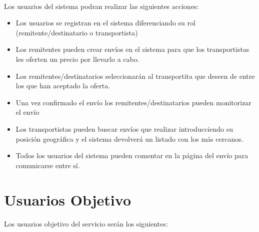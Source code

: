 \documentclass[10pt, a4paper,spanish]{article}
\begin{document}
			\paragraph{}
			Los usuarios del sistema podran realizar las siguientes acciones:

			\begin{itemize}

				\item Los usuarios se registran en el sistema diferenciando su rol (remitente/destinatario o transportista)

				\item Los remitentes pueden crear envíos en el sistema para que los transportistas les oferten un precio por llevarlo a cabo.

				\item Los remitentes/destinatarios seleccionarán al transportita que deseen de entre los que han aceptado la oferta.

				\item Una vez confirmado el envío los remitentes/destinatarios pueden monitorizar el envío

				\item Los transportistas pueden buscar envíos que realizar introducciendo su posición geográfica y el sistema devolverá un listado con los más cercanos.

				\item Todos los usuarios del sistema pueden comentar en la página del envío para comunicarse entre sí.
			\end{itemize}



		\section{Usuarios Objetivo}

			\paragraph{}
			Los usuarios objetivo del servicio serán los siguientes:
\end{document}

